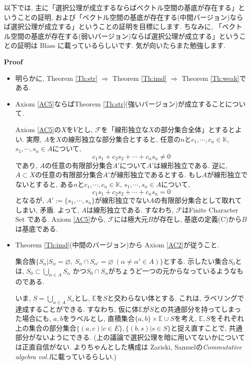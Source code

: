 \documentclass[a4paper]{ujarticle}
\makeatletter
\numberwithin{equation}{section}
\theoremstyle{definition}
\renewenvironment{proof}[1][Proof]{\par
  \pushQED{\qed}%
  \normalfont \topsep6\p@\@plus6\p@\relax
  \trivlist
  \item\relax
  {\bfseries
  #1\@addpunct{.}}\hspace\labelsep\ignorespaces
}{%
  \popQED\endtrivlist\@endpefalse
}
\makeatother
\begin{document}
    以下では, 主に「選択公理が成立するならばベクトル空間の基底が存在する」ということの証明,
    および「ベクトル空間の基底が存在する(中間バージョン)ならば選択公理が成立する」ということの証明を目標にします.
    ちなみに, 「ベクトル空間の基底が存在する(弱いバージョン)ならば選択公理が成立する」ということの証明は
    Blass \cite{Blass84}に載っているらしいです. 気が向いたらまた勉強します.
    \begin{proof}
        \begin{itemize}
            \item 明らかに, Theorem \ref{Th:str} $\Rightarrow$ Theorem \ref{Th:imd} $\Rightarrow$ Theorem \ref{Th:weak}である.
            \item Axiom \ref{AC5}ならばTheorem \ref{Th:str}(強いバージョン)が成立することについて.
             
            Axiom \ref{AC5}の$X$を$V$とし, $\mathcal{F}$を「線形独立な$X$の部分集合全体」とするとよい.
            実際, $A$を$X$の線形独立な部分集合とすると, 任意の$n$と$c_1, \cdots, c_n \in \mathbb{K}$,
            $s_1, \cdots, s_n \in A$について, 
            \[
                c_1 s_1 + c_2 s_2 + \cdots + c_n s_n \neq 0 
            \]
            であり, $A$の任意の有限部分集合$A'$について$A'$は線形独立である. 
            逆に, $A \subset X$の任意の有限部分集合$A'$が線形独立であるとする.
            もし$A$が線形独立でないとすると, ある$n$と$c_1, \cdots, c_n \in \mathbb{K}$,
            $s_1, \cdots, s_n \in A$について,
            \[
                c_1 s_1 + c_2 s_2 + \cdots + c_n s_n = 0 
            \]
            となるが, $A' := \{s_1, \cdots, s_n\}$が線形独立でない$A$の有限部分集合として取れてしまい, 矛盾.
            よって, $A$は線形独立である. すなわち, $\mathcal{F}$はFinite Character Set である.
            Axiom \ref{AC5}から, $\mathcal{F}$には極大元$B$が存在し, 基底の定義(C)から$B$は基底である.
            \item Theorem \ref{Th:imd}(中間のバージョン)から Axiom \ref{AC2}が従うこと.
            
            集合族$\{S_{\alpha}| S_{\alpha} = \varnothing, \ S_{\alpha} \cap S_{\alpha'} = \varnothing \ (\alpha \neq \alpha' \in A)\}$とする.
            示したい集合$S_0$とは, $S_0 \subset \bigcup_{\alpha \in A} S_{\alpha}$
            かつ$S_{0} \cap S_{\alpha}$がちょうど一つの元からなっているようなものである.

            いま, $\displaystyle S = \bigcup_{\alpha \in A} S_{\alpha}$とし, 
            $\mathbb{E}$を$S$と交わらない体とする.
            これは, ラベリングで達成することができる. すなわち, 仮に体$\mathbb{E}$が$S$との共通部分を持ってしまった場合にも,
            $a, b$をラベルとし, 直積集合$\{a, b\} \times \mathbb{E} \cup S$を考え,
            $\mathbb{E}, S$をそれぞれ上の集合の部分集合$\{(a, c) | c \in E\}, \{(b, s) | s \in S\}$と捉え直すことで,
            共通部分がないようにできる.
            (上の議論で選択公理を暗に用いてないかについては正直自信がない. よりちゃんとした構成は
            Zariski, Samuelの\textit{Commutative algebra vol.I}に載っているらしい.)


\end{itemize}
\end{proof}
\end{document}
